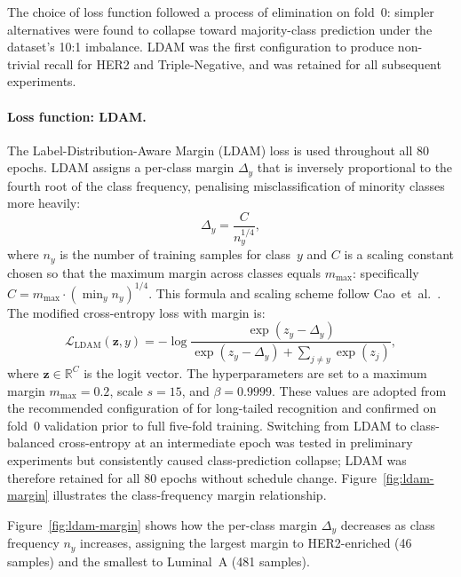 The choice of loss function followed a process of
elimination on fold~0: simpler alternatives were found to
collapse toward majority-class prediction under the
dataset's 10:1 imbalance.
LDAM \cite{cao2019ldam} was the first configuration to
produce non-trivial recall for HER2 and Triple-Negative,
and was retained for all subsequent experiments.

\paragraph{Loss function: LDAM.}
The Label-Distribution-Aware Margin (LDAM) loss
\cite{cao2019ldam} is used throughout all 80 epochs.
LDAM assigns a per-class margin $\Delta_y$ that is inversely
proportional to the fourth root of the class frequency,
penalising misclassification of minority classes more heavily:
\begin{equation}
  \Delta_y = \frac{C}{n_y^{1/4}},
  \label{eq:ldam-margin}
\end{equation}
where $n_y$ is the number of training samples for class~$y$
and $C$ is a scaling constant chosen so that the maximum
margin across classes equals $m_{\max}$: specifically
$C = m_{\max} \cdot (\min_y n_y)^{1/4}$.
This formula and scaling scheme follow
Cao~et~al.\ \cite{cao2019ldam}.
The modified cross-entropy loss with margin is:
\begin{equation}
  \mathcal{L}_{\mathrm{LDAM}}(\mathbf{z}, y)
  = -\log
    \frac{
      \exp(z_y - \Delta_y)
    }{
      \exp(z_y - \Delta_y)
      + \displaystyle\sum_{j \neq y} \exp(z_j)
    },
  \label{eq:ldam-loss}
\end{equation}
where $\mathbf{z} \in \mathbb{R}^C$ is the logit vector.
The hyperparameters are set to a maximum margin
$m_{\max} = 0.2$, scale $s = 15$, and $\beta = 0.9999$.
These values are adopted from the recommended configuration
of \textcite{cao2019ldam} for long-tailed recognition and
confirmed on fold~0 validation prior to full five-fold
training.
Switching from LDAM to class-balanced cross-entropy at an
intermediate epoch was tested in preliminary experiments but
consistently caused class-prediction collapse; LDAM was
therefore retained for all 80 epochs without schedule change.
Figure~\ref{fig:ldam-margin} illustrates the
class-frequency margin relationship.

Figure~\ref{fig:ldam-margin} shows how the per-class margin
$\Delta_y$ decreases as class frequency $n_y$ increases,
assigning the largest margin to HER2-enriched (46 samples)
and the smallest to Luminal~A (481 samples).

